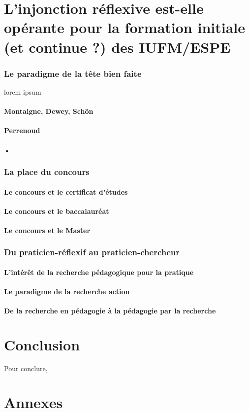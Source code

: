 \documentclass[a4paper,11pt]{article}
\begin{document}
\part{L'injonction réflexive est-elle opérante pour la formation initiale (et continue ?) des IUFM/ESPE}

\section{Le paradigme de la tête bien faite}
lorem ipsum
			\subsection{Montaigne, Dewey, Schön}
			\subsection{Perrenoud}
			\subsection{•}


\section{La place du concours}

			\subsection{Le concours et le certificat d'études}
			\subsection{Le concours et le baccalauréat}
			\subsection{Le concours et le Master}
			
\section{Du praticien-réflexif au praticien-chercheur}

			\subsection{L'intérêt de la recherche pédagogique pour la pratique}
			\subsection{Le paradigme de la recherche action}
			\subsection{De la recherche en pédagogie à la pédagogie par la recherche}



\part*{Conclusion}
Pour conclure,


\part*{Annexes}
\label{annexe1}

\nocite{*}


\end{document}
